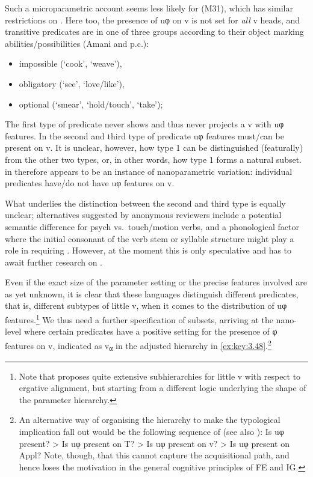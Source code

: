 \documentclass[output=paper]{langsci/langscibook}
\begin{document}
Such a microparametric account seems less likely for  (M31),
which has similar restrictions on  \citep{Lusekelo2012}. Here
too, the presence of uφ on v is not set for \emph{all} v heads, and transitive
predicates are in one of three groups according to their object marking
abilities/possibilities (Amani \citealt{Lusekelo2012} and p.c.):

\begin{itemize}
    \item impossible (‘cook’, ‘weave’),
    \item obligatory (‘see’, ‘love/like’),
    \item optional (‘smear’, ‘hold/touch’, ‘take’);
\end{itemize}

The first type of predicate never shows  and thus never projects
a v with uφ features. In the second and third type of predicate uφ features
must/can be present on v. It is unclear, however, how type 1 can be
distinguished (featurally) from the other two types, or, in other words, how
type 1 forms a natural subset.  in  therefore appears to
be an instance of nanoparametric variation: individual predicates have/do not
have uφ features on v.

What underlies the distinction between the second and third type is equally
unclear; alternatives suggested by anonymous reviewers include a potential
semantic difference for psych vs.\ touch/motion verbs, and a phonological
factor where the initial consonant of the verb stem or syllable structure might
play a role in requiring . However, at the moment this is
only speculative and has to await further research on 
.

Even if the exact size of the parameter setting or the precise features
involved are as yet unknown, it is clear that these languages distinguish
different predicates, that is, different subtypes of little v, when it comes to
the distribution of uφ features.\footnote{Note that
    \textcite{Sheehan2014,Sheehan2017} proposes quite extensive subhierarchies
    for little v with respect to ergative alignment, but
    starting from a different logic underlying the shape of the parameter
hierarchy.} We thus need a further specification of subsets, arriving at the
nano-level where certain predicates have a positive setting for the presence of
φ features on v, indicated as v\textsubscript{α} in the adjusted
hierarchy in \eqref{ex:key:3.48}.\footnote{An alternative way of organising the
    hierarchy to make the typological implication fall out would be the
    following sequence of  (see also \citealt{Barany2015}): Is
    uφ present? > Is uφ present on T? > Is uφ present on v? > Is uφ present on
    Appl? Note, though, that this cannot capture the acquisitional path, and hence loses the motivation in the general cognitive
    principles of \gls{FE} and \gls{IG}.}
\end{document}
